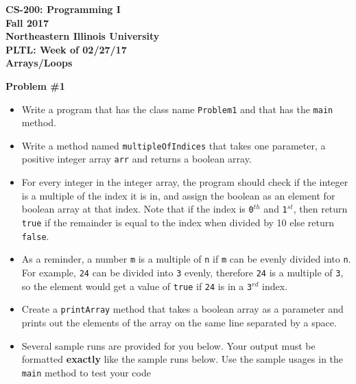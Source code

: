 \documentclass[12pt]{article}
\begin{document}
	\begin{center}
		\textbf{CS-200: Programming I}\\
		\textbf{Fall 2017}\\
		\textbf{Northeastern Illinois University}\\
		\textbf{PLTL: Week of 02/27/17}\\
		\textbf{Arrays/Loops}
	\end{center}
	
	\noindent\textbf{Problem \#1}
	\begin{itemize}
		\item Write a program that has the class name \texttt{Problem1} and that has the \texttt{main} method. 
		\item Write a method named \texttt{multipleOfIndices} that takes one parameter, a positive integer array \texttt{arr} and returns a boolean array. 
		\item For every integer in the integer array, the program should check if the integer is a multiple of the index it is in, and assign the boolean as an element for boolean array at that index. Note that  if the index is \texttt{0$^{th}$} and \texttt{1$^{st}$}, then return \texttt{true} if the remainder is equal to the index when divided by 10 else return \texttt{false}.
		
		\item As a reminder, a number \texttt{m} is a multiple of \texttt{n} if \texttt{m} can be evenly divided into \texttt{n}. For example, \texttt{24} can be divided into \texttt{3} evenly, therefore \texttt{24} is a multiple of \texttt{3}, so the element would get a value of \texttt{true} if \texttt{24} is in a \texttt{3$^{rd}$} index.
		
		\item Create a \texttt{printArray} method that takes a boolean array as a parameter and prints out the elements of the array on the same line separated by a space.
		
		\item Several sample runs are provided for you below. Your output must be formatted \textbf{exactly} like the sample runs below. Use the sample usages in the \texttt{main} method to test your code 
	\end{itemize}
\end{document}
